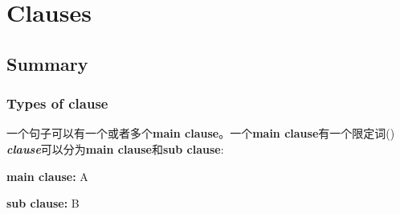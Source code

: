 \chapter{Clauses}

\def\mc{{\bf main clause}}
\def\sc{{\bf sub clause}}

\section{Summary}

\subsection{Types of clause}

一个句子可以有一个或者多个\mc。一个\mc 有一个限定词()
\emph{\bf clause}可以分为\mc 和\sc:

\begin{description}
\item{\bf main clause:} A
\item{\bf sub clause:} B
\end{description}
